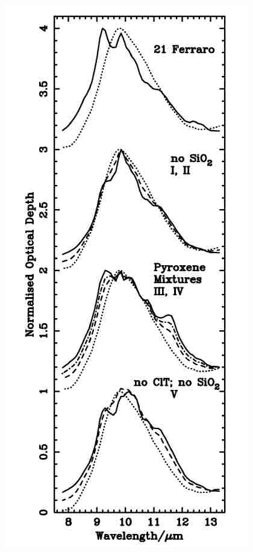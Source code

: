\begin{frame}
\begin{minipage}[t]{0.3\textwidth}
\begin{center}
\includegraphics[width=\textwidth,height=!]{./D/bowey_mod_taus.jpg}
    \end{center}
\end{minipage}
\hfill



\end{frame}
